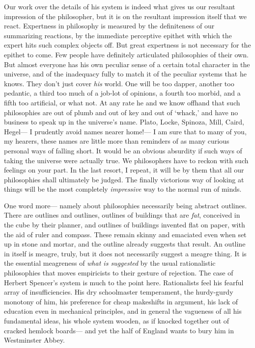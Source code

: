 \documentclass[]{article}
\begin{document}
Our work over the details of his system is indeed what gives us our
resultant impression of the philosopher, but it is on the resultant
impression itself that we react. Expertness in philosophy is measured
by the definiteness of our summarizing reactions, by the immediate
perceptive epithet with which the expert hits such complex objects
off. But great expertness is not necessary for the epithet to come. Few
people have definitely articulated philosophies of their own. But almost
everyone has his own peculiar sense of a certain total character in
the universe, and of the inadequacy fully to match it of the peculiar
systems that he knows. They don't just cover \emph{his} world. One will be too
dapper, another too pedantic, a third too much of a job-lot of opinions,
a fourth too morbid, and a fifth too artificial, or what not. At any
rate he and we know offhand that such philosophies are out of plumb and
out of key and out of `whack,' and have no business to speak up in the
universe's name. Plato, Locke, Spinoza, Mill, Caird, Hegel--- I prudently
avoid names nearer home!--- I am sure that to many of you, my hearers,
these names are little more than reminders of as many curious personal
ways of falling short. It would be an obvious absurdity if such ways of
taking the universe were actually true. We philosophers have to reckon
with such feelings on your part. In the last resort, I repeat, it will
be by them that all our philosophies shall ultimately be judged. The
finally victorious way of looking at things will be the most completely
\emph{impressive} way to the normal run of minds.

One word more--- namely about philosophies necessarily being abstract
outlines. There are outlines and outlines, outlines of buildings
that are \emph{fat}, conceived in the cube by their planner, and outlines of
buildings invented flat on paper, with the aid of ruler and compass.
These remain skinny and emaciated even when set up in stone and mortar,
and the outline already suggests that result. An outline in itself is
meagre, truly, but it does not necessarily suggest a meagre thing. It is
the essential meagreness of \emph{what is suggested} by the usual rationalistic
philosophies that moves empiricists to their gesture of rejection. The
case of Herbert Spencer's system is much to the point here. Rationalists
feel his fearful array of insufficiencies. His dry schoolmaster
temperament, the hurdy-gurdy monotony of him, his preference for
cheap makeshifts in argument, his lack of education even in mechanical
principles, and in general the vagueness of all his fundamental ideas,
his whole system wooden, as if knocked together out of cracked hemlock
boards--- and yet the half of England wants to bury him in Westminster
Abbey.
\end{document}
